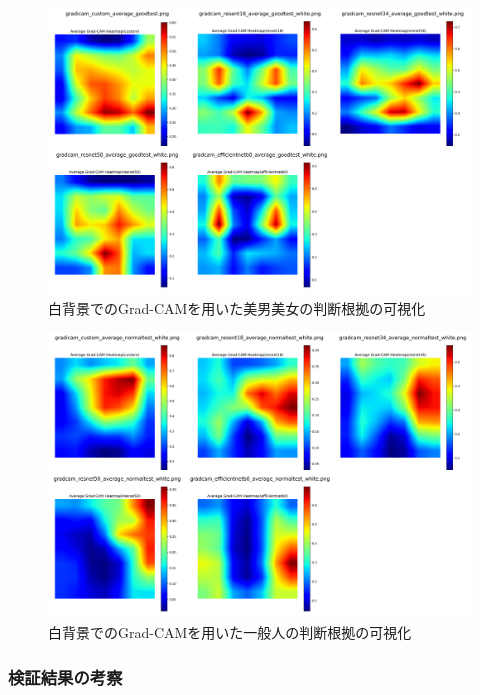 \documentclass[a4paper,11pt,titlepage]{jsarticle}
\begin{document}
\begin{figure}[H]
    \centering
    \includegraphics[width=1.1\textwidth]{white_combined_images_good.png}
    \caption{白背景でのGrad-CAMを用いた美男美女の判断根拠の可視化}
    \label{fig:gradcam_good_white}
\end{figure}
\begin{figure}[H]
    \centering
    \includegraphics[width=1.1\textwidth]{white_combined_images_normal.png}
    \caption{白背景でのGrad-CAMを用いた一般人の判断根拠の可視化}
    \label{fig:gradcam_normal_white}
\end{figure}


\subsubsection{検証結果の考察}
\label{label:検証結果の考察}
\end{document}
